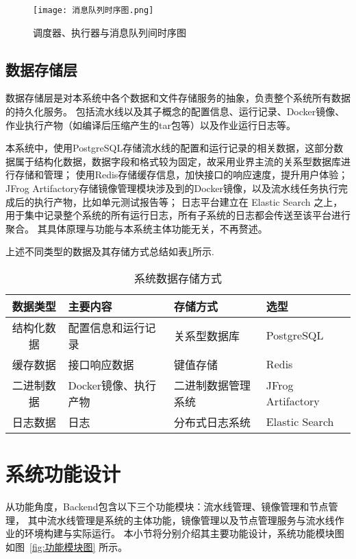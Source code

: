 \begin{figure}[h]
  \centering
  \texttt{[image: 消息队列时序图.png]}
  \caption{调度器、执行器与消息队列间时序图}
  \label{fig:消息队列时序图}
\end{figure}

\subsection{数据存储层}
数据存储层是对本系统中各个数据和文件存储服务的抽象，负责整个系统所有数据的持久化服务。
包括流水线以及其子概念的配置信息、运行记录、Docker镜像、作业执行产物（如编译后压缩产生的tar包等）以及作业运行日志等。

本系统中，使用PostgreSQL存储流水线的配置和运行记录的相关数据，这部分数据属于结构化数据，数据字段和格式较为固定，故采用业界主流的关系型数据库进行存储和管理；
使用Redis存储缓存信息，加快接口的响应速度，提升用户体验；
JFrog Artifactory存储镜像管理模块涉及到的Docker镜像，以及流水线任务执行完成后的执行产物，比如单元测试报告等；
日志平台建立在 Elastic Search 之上，用于集中记录整个系统的所有运行日志，所有子系统的日志都会传送至该平台进行聚合。
其具体原理与功能与本系统主体功能无关，不再赘述。

上述不同类型的数据及其存储方式总结如表\ref{tab:系统数据存储方式}所示.

\begin{table}[h]
  \centering
  \caption{系统数据存储方式}
  \label{tab:系统数据存储方式}
  \begin{tabular}{clll}
    \toprule
    数据类型 & 主要内容      & 存储方式   & 选型 \\
    \midrule
    结构化数据     & 配置信息和运行记录      & 关系型数据库   & PostgreSQL       \\
    缓存数据       & 接口响应数据                   & 键值存储   & Redis       \\
    二进制数据     & Docker镜像、执行产物  & 二进制数据管理系统   & JFrog Artifactory   \\
    日志数据       & 日志                & 分布式日志系统  & Elastic Search       \\
    \bottomrule
  \end{tabular}
\end{table}

\section{系统功能设计}

从功能角度，Backend包含以下三个功能模块：流水线管理、镜像管理和节点管理，
其中流水线管理是系统的主体功能，镜像管理以及节点管理服务与流水线作业的环境构建与实际运行。
本小节将分别介绍其主要功能设计，系统功能模块图如图~\ref{fig:功能模块图} 所示。

